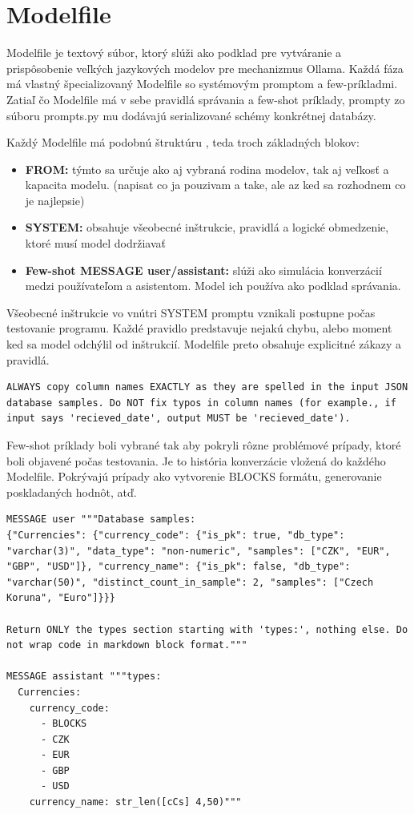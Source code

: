\section{Modelfile}
Modelfile je textový súbor, ktorý slúži ako podklad pre vytváranie a prispôsobenie veľkých jazykových modelov pre mechanizmus Ollama. Každá fáza má vlastný špecializovaný Modelfile so systémovým promptom a few-príkladmi. Zatiaľ čo Modelfile má v sebe pravidlá správania a few-shot príklady, prompty zo súboru prompts.py mu dodávajú serializované schémy konkrétnej databázy.

Každý Modelfile má podobnú štruktúru , teda troch základných blokov:

\begin{itemize}
    \item \textbf{FROM:} týmto sa určuje ako aj vybraná rodina modelov, tak aj veľkosť a kapacita modelu. (napisat co ja pouzivam a take, ale az ked sa rozhodnem co je najlepsie)
    \item \textbf{SYSTEM:} obsahuje všeobecné inštrukcie, pravidlá a logické obmedzenie, ktoré musí model dodržiavať
    \item \textbf{Few-shot MESSAGE user/assistant:} slúži ako simulácia konverzácií medzi používateľom a asistentom. Model ich používa ako podklad správania.
\end{itemize}

Všeobecné inštrukcie vo vnútri SYSTEM promptu vznikali postupne počas testovanie programu. Každé pravidlo predstavuje nejakú chybu, alebo moment ked sa model odchýlil od inštrukcií. Modelfile preto obsahuje explicitné zákazy a pravidlá.

\begin{lstlisting}[caption={Príklad pravidla}, label={lst:rule_example}, linewidth=\textwidth]
ALWAYS copy column names EXACTLY as they are spelled in the input JSON database samples. Do NOT fix typos in column names (for example., if input says 'recieved_date', output MUST be 'recieved_date').
\end{lstlisting}

Few-shot príklady boli vybrané tak aby pokryli rôzne problémové prípady, ktoré boli objavené počas testovania. Je to história konverzácie vložená do každého Modelfile. Pokrývajú prípady ako vytvorenie BLOCKS formátu, generovanie poskladaných hodnôt, atď.

\begin{lstlisting}[caption={Príklad MESSAGE user}, label={lst:message_user}, linewidth=\textwidth]
MESSAGE user """Database samples:
{"Currencies": {"currency_code": {"is_pk": true, "db_type": "varchar(3)", "data_type": "non-numeric", "samples": ["CZK", "EUR", "GBP", "USD"]}, "currency_name": {"is_pk": false, "db_type": "varchar(50)", "distinct_count_in_sample": 2, "samples": ["Czech Koruna", "Euro"]}}}

Return ONLY the types section starting with 'types:', nothing else. Do not wrap code in markdown block format."""

MESSAGE assistant """types:
  Currencies:
    currency_code:
      - BLOCKS
      - CZK
      - EUR
      - GBP
      - USD
    currency_name: str_len([cCs] 4,50)"""

\end{lstlisting}

